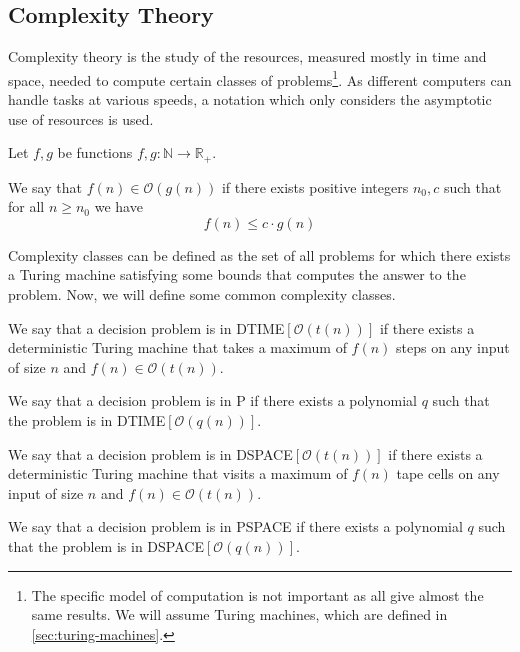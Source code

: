 \subsection{Complexity Theory}\label{subsec:complexity-theory}

Complexity theory is the study of the resources, measured mostly in time and space, needed to compute certain classes of problems\footnote{The specific model of computation is not important as all give almost the same results. We will assume Turing machines, which are defined in \cref{sec:turing-machines}.}.
As different computers can handle tasks at various speeds, a notation which only considers the asymptotic use of resources is used.

\begin{define}
    Let $f, g$ be functions $f, g: \mathbb{N} \to \mathbb{R}_+$.

    We say that $f(n) \in \mathcal{O}(g(n))$ if there exists positive integers $n_0, c$ such that for all $n \geq n_0$ we have \[f(n) \leq c\cdot g(n)\]
\end{define}

Complexity classes can be defined as the set of all problems for which there exists a Turing machine satisfying some bounds that computes the answer to the problem.
Now, we will define some common complexity classes.

\begin{define}
[{DTIME$[\mathcal{O}(t(n))]$}]
    We say that a decision problem is in DTIME$[\mathcal{O}(t(n))]$ if there exists a deterministic Turing machine that takes a maximum of $f(n)$ steps on any input of size $n$ and $f(n) \in \mathcal{O}(t(n))$.
\end{define}

\begin{define}[P]
    We say that a decision problem is in P if there exists a polynomial $q$ such that the problem is in DTIME$[\mathcal{O}(q(n))]$.
\end{define}

\begin{define}
[{DSPACE$[\mathcal{O}(t(n))]$}]
    We say that a decision problem is in DSPACE$[\mathcal{O}(t(n))]$ if there exists a deterministic Turing machine that visits a maximum of $f(n)$ tape cells on any input of size $n$ and $f(n) \in \mathcal{O}(t(n))$.
\end{define}

\begin{define}[PSPACE]
    We say that a decision problem is in PSPACE if there exists a polynomial $q$ such that the problem is in DSPACE$[\mathcal{O}(q(n))]$.
\end{define}

